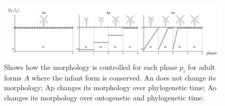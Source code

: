 \begin{figure}
  \centering
  \hspace*{-30pt} 
  \includegraphics[scale=1.0]{fig/morph-var-a.pdf} 
  \vspace{-15pt}
  \caption[Variations of morphological change]{\label{fig:morph-var-a}
    Shows how the morphology is controlled for each phase $p_i$ for
    adult forms $A$ where the infant form is conserved.  An
    does not change its morphology; Ap changes its morphology over
    phylogenetic time; Ao changes its morphology over ontogenetic and
    phylogenetic time.}
\end{figure}

